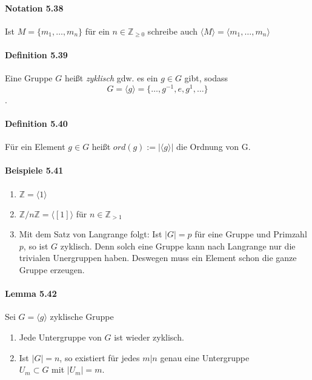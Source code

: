 \documentclass{scrartcl}
\begin{document}
\paragraph{Notation 5.38}
Ist $M = \{m_1, \dots, m_n\}$ für ein $n \in \mathbb{Z}_{\geq 0}$ schreibe auch
$\langle M \rangle = \langle m_1, \dots, m_n \rangle$

\paragraph{Definition 5.39}
Eine Gruppe $G$ heißt \textit{zyklisch} gdw. es ein $g \in G$ gibt, sodass
\[
  G = \langle {g} \rangle = \{\dots, g^{-1}, e, g^1, \dots\}
\]
.

\paragraph{Definition 5.40}
Für ein Element $g \in G$ heißt $ord(g) := |\langle {g} \rangle|$ die Ordnung
von G.

\paragraph{Beispiele 5.41}
\begin{enumerate}
\item $\mathbb{Z} = \langle {1} \rangle$
\item $\mathbb{Z}/n\mathbb{Z} = \langle {[1]} \rangle$ für $n \in \mathbb{Z}_{>
    1}$
\item Mit dem Satz von Langrange folgt: Ist $|G| = p$ für eine Gruppe und
  Primzahl $p$, so ist $G$ zyklisch. Denn solch eine Gruppe kann nach Langrange
  nur die trivialen Unergruppen haben. Deswegen muss ein Element schon die ganze
  Gruppe erzeugen.
\end{enumerate}

\paragraph{Lemma 5.42}
Sei $G = \langle {g} \rangle$ zyklische Gruppe
\begin{enumerate}
\item Jede Untergruppe von $G$ ist wieder zyklisch.
\item Ist $|G| = n$, so existiert für jedes $m|n$ genau eine Untergruppe \\ $U_m
  \subset G$ mit $|U_m| = m$.
\end{enumerate}
\end{document}
